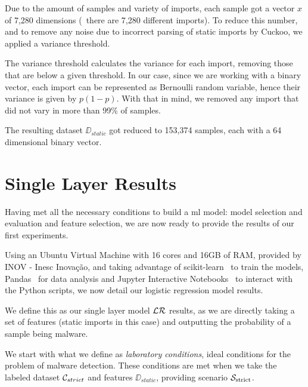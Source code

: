 Due to the amount of samples and variety of imports, each sample got a vector $x$ of 7,280 dimensions (\ie\ there are 7,280 different imports).
To reduce this number, and to remove any noise due to incorrect parsing of static imports by Cuckoo, we applied a variance threshold.

The variance threshold calculates the variance for each import, removing those that are below a given threshold.
In our case, since we are working with a binary vector, each import can be represented as Bernoulli random variable, hence their variance is given by $p(1-p)$.
With that in mind, we removed any import that did not vary in more than 99\% of samples.

The resulting dataset $\DD_{static}$ got reduced to 153,374 samples, each with a 64 dimensional binary vector.

\section{Single Layer Results}
\label{section:single_layer_results}

Having met all the necessary conditions to build a \gls{ml} model: model selection and evaluation and feature selection, we are now ready to provide the results of our first experiments.

Using an Ubuntu Virtual Machine with 16 cores and 16GB of RAM, provided by INOV - Inesc Inovação, and taking advantage of scikit-learn~\cite{tool:sklearn} to train the models, Pandas~\cite{tool:pandas} for data analysis and Jupyter Interactive Notebooks~\cite{tool:jupyter} to interact with the Python scripts, we now detail our logistic regression model results.

We define this as our single layer model $\mathcal{LR}$ results, as we are directly taking a set of features (static imports in this case) and outputting the probability of a sample being malware.

\medskip

We start with what we define as \textit{laboratory conditions}, ideal conditions for the problem of malware detection.
These conditions are met when we take the labeled dataset $\mathcal{C}_{strict}$ and features $\DD_{static}$, providing scenario $\mathcal{S}_{\mathrm{strict}}$.


